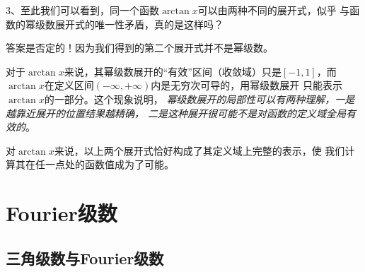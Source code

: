 \begin{shaded}
	\begin{center}
	\end{center}
	
	3、至此我们可以看到，同一个函数$\arctan x$可以由两种不同的展开式，似乎
	与函数的幂级数展开式的唯一性矛盾，真的是这样吗？
	
	答案是否定的！因为我们得到的第二个展开式并不是幂级数。
	
	对于$\arctan x$来说，其幂级数展开的“有效”区间（收敛域）只是$[-1,1]$，而
	$\arctan x$在定义区间$(-\infty,+\infty)$内是无穷次可导的，用幂级数展开
	只能表示$\arctan x$的一部分。这个现象说明，
	{\it 幂级数展开的局部性可以有两种理解，一是越靠近展开的位置结果越精确，
	二是这种展开很可能不是对函数的定义域全局有效的}。
	
	对$\arctan x$来说，以上两个展开式恰好构成了其定义域上完整的表示，使
	我们计算其在任一点处的函数值成为了可能。
\end{shaded}

\section{Fourier级数}

\subsection{三角级数与Fourier级数}

